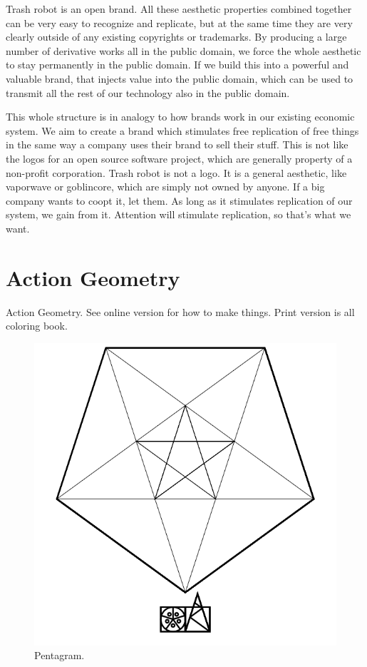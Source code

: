\documentclass{report}
\begin{document}
Trash robot is an open brand.  All these aesthetic properties combined together can be very easy to recognize and replicate, but at the same time they are very clearly outside of any existing copyrights or trademarks.  By producing a large number of derivative works all in the public domain, we force the whole aesthetic to stay permanently in the public domain. If we build this into a powerful and valuable brand, that injects value into the public domain, which can be used to transmit all the rest of our technology also in the public domain. 

This whole structure is in analogy to how brands work in our existing economic system.  We aim to create a brand which stimulates free replication of free things in the same way a company uses their brand to sell their stuff.  This is not like the logos for an open source software project, which are generally property of a non-profit corporation.  Trash robot is not a logo. It is a general aesthetic, like vaporwave or goblincore, which are simply not owned by anyone.  If a big company wants to coopt it, let them.   As long as it stimulates replication of our system, we gain from it.  Attention will stimulate replication, so that's what we want.  


\section{Action Geometry}

Action Geometry. See online version for how to make things.  Print version is all coloring book.

\begin{figure}
	\centering
	\includegraphics[width=5in]{imageserver/uploadimages/image4.png}
	\caption{Pentagram.}
\end{figure}
\end{document}
